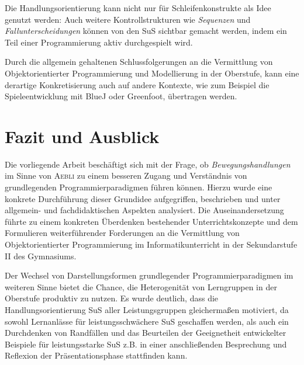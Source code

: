 \documentclass[paper=a4, DIV=13, BCOR=12mm, twoside=on, onecolumn=on, open = any, titlepage =on, parskip =half-, headsepline = on, footsepline = on, chapterprefix = on, sectionprefix = on, appendixprefix = off, fontsize = 12pt, numbers = noenddot, abstract = off]{scrreprt}
\begin{document}
Die Handlungsorientierung kann nicht nur für Schleifenkonstrukte als Idee genutzt werden: Auch weitere Kontrollstrukturen wie \emph{Sequenzen} und  \emph{Fallunterscheidungen} können von den SuS sichtbar gemacht werden, indem ein Teil einer Programmierung aktiv durchgespielt wird.


Durch die allgemein gehaltenen Schlussfolgerungen an die Vermittlung von Objektorientierter Programmierung und Modellierung in der Oberstufe, kann eine derartige Konkretisierung auch auf andere Kontexte, wie zum Beispiel die Spieleentwicklung mit BlueJ oder Greenfoot, übertragen werden.




\newpage
\chapter{Fazit und Ausblick}
\onehalfspacing
\vspace*{-1cm}

Die vorliegende Arbeit beschäftigt sich mit der Frage, ob \emph{Bewegungshandlungen} im Sinne von \textsc{Aebli} zu einem besseren Zugang und Verständnis von grundlegenden Programmierparadigmen führen können. Hierzu wurde eine konkrete Durchführung dieser Grundidee aufgegriffen, beschrieben und unter allgemein- und fachdidaktischen Aspekten analysiert. Die Auseinandersetzung führte zu einem konkreten Überdenken bestehender Unterrichtskonzepte und dem Formulieren weiterführender Forderungen an die Vermittlung von Objektorientierter Programmierung im Informatikunterricht in der Sekundarstufe II des Gymnasiums.

Der Wechsel von Darstellungsformen grundlegender Programmierparadigmen im weiteren Sinne bietet die Chance, die Heterogenität von Lerngruppen in der Oberstufe produktiv zu nutzen. Es wurde deutlich, dass die Handlungsorientierung SuS aller Leistungsgruppen gleichermaßen motiviert, da sowohl Lernanlässe für leistungsschwächere SuS geschaffen werden, als auch ein Durchdenken von Randfällen und das Beurteilen der Geeignetheit entwickelter Beispiele für leistungsstarke SuS z.B. in einer anschließenden Besprechung und Reflexion der Präsentationsphase stattfinden kann. 
\end{document}
